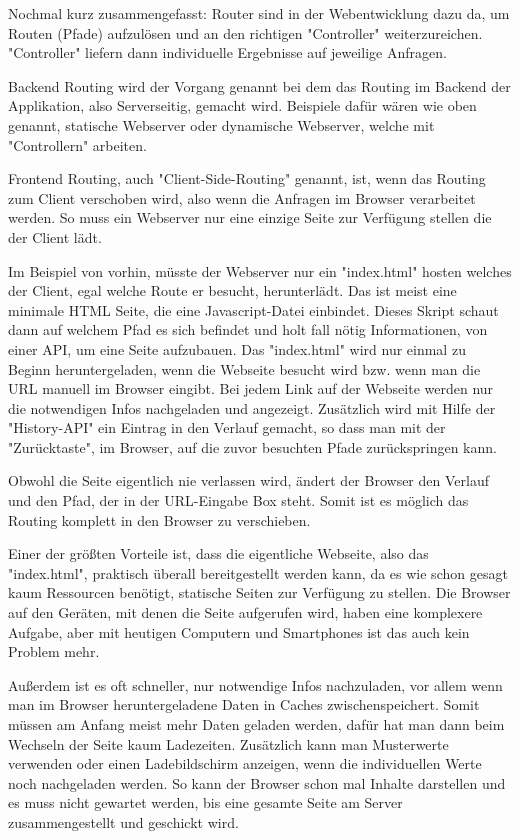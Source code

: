 Nochmal kurz zusammengefasst: Router sind in der Webentwicklung dazu da, um Routen (Pfade) aufzulösen und an den richtigen "Controller" weiterzureichen. "Controller" liefern dann individuelle Ergebnisse auf jeweilige Anfragen.


Backend Routing wird der Vorgang genannt bei dem das Routing im Backend der Applikation, also Serverseitig, gemacht wird. Beispiele dafür wären wie oben genannt, statische Webserver oder dynamische Webserver, welche mit "Controllern" arbeiten.


Frontend Routing, auch "Client-Side-Routing" genannt, ist, wenn das Routing zum Client verschoben wird, also wenn die Anfragen im Browser verarbeitet werden. So muss ein Webserver nur eine einzige Seite zur Verfügung stellen die der Client lädt.

Im Beispiel von vorhin, müsste der Webserver nur ein "{\ttfamily index.html}" hosten welches der Client, egal welche Route er besucht, herunterlädt. Das ist meist eine minimale HTML Seite, die eine Javascript-Datei einbindet. Dieses Skript schaut dann auf welchem Pfad es sich befindet und holt fall nötig Informationen, von einer API, um eine Seite aufzubauen. Das "{\ttfamily index.html}" wird nur einmal zu Beginn heruntergeladen, wenn die Webseite besucht wird bzw. wenn man die URL manuell im Browser eingibt. Bei jedem Link auf der Webseite werden nur die notwendigen Infos nachgeladen und angezeigt. Zusätzlich wird mit Hilfe der "History-API" ein Eintrag in den Verlauf gemacht, so dass man mit der "Zurücktaste", im Browser, auf die zuvor besuchten Pfade zurückspringen kann.

Obwohl die Seite eigentlich nie verlassen wird, ändert der Browser den Verlauf und den Pfad, der in der URL-Eingabe Box steht. Somit ist es möglich das Routing komplett in den Browser zu verschieben.


Einer der größten Vorteile ist, dass die eigentliche Webseite, also das "{\ttfamily index.html}", praktisch überall bereitgestellt werden kann, da es wie schon gesagt kaum Ressourcen benötigt, statische Seiten zur Verfügung zu stellen. Die Browser auf den Geräten, mit denen die Seite aufgerufen wird, haben eine komplexere Aufgabe, aber mit heutigen Computern und Smartphones ist das auch kein Problem mehr.

Außerdem ist es oft schneller, nur notwendige Infos nachzuladen, vor allem wenn man im Browser heruntergeladene Daten in Caches zwischenspeichert. Somit müssen am Anfang meist mehr Daten geladen werden, dafür hat man dann beim Wechseln der Seite kaum Ladezeiten. Zusätzlich kann man Musterwerte verwenden oder einen Ladebildschirm anzeigen, wenn die individuellen Werte noch nachgeladen werden. So kann der Browser schon mal Inhalte darstellen und es muss nicht gewartet werden, bis eine gesamte Seite am Server zusammengestellt und geschickt wird.

